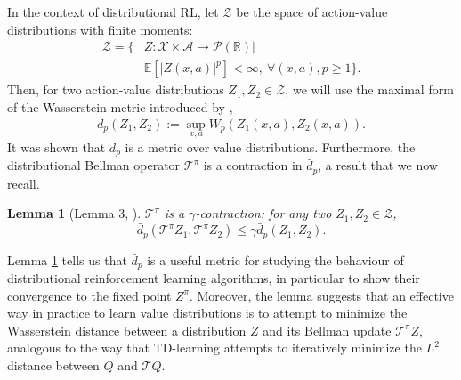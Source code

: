\documentclass[letterpaper]{article}
\newcommand{\cZ}{\mathcal{Z}}
\newcommand{\cT}{\mathcal{T}}
\newtheorem{lem}{Lemma}
\def \cTpi {\cT^\pi}
\def \dip {\bar d_p}
\begin{document}
In the context of distributional RL, let $\cZ$ be the space of action-value distributions with finite  moments:
\begin{align*}
    \mathcal{Z} = \{ &Z : \mathcal{X} \times \mathcal{A} \rightarrow \mathscr{P}(\mathbb{R}) |\\     &\mathbb{E}\left\lbrack |Z(x, a)|^p \right\rbrack < \infty, \ \forall (x, a), p \geq 1 \}.
\end{align*}
Then, for two action-value distributions $Z_1, Z_2 \in \cZ$, we will use the maximal form of the Wasserstein metric introduced by \cite{c51},
\begin{equation}\label{eqn:maxw}
    \dip(Z_1, Z_2) := \sup_{x,a} W_p(Z_1(x, a), Z_2(x, a)).
\end{equation}
It was shown that $\dip$ is a metric over value distributions. Furthermore, the distributional Bellman operator $\cTpi$ is a contraction in $\dip$, a result that we now recall.
\begin{lem}[Lemma 3, \citeauthor{c51} \citeyear{c51}]\label{lem:wasserstein_contraction_operator}
$\cTpi$ is a $\gamma$-contraction: for any two $Z_1, Z_2 \in \cZ$,
\begin{equation*}
    \dip(\cTpi Z_1, \cTpi Z_2) \le \gamma \dip(Z_1, Z_2) .
\end{equation*}
\end{lem}
Lemma \ref{lem:wasserstein_contraction_operator} tells us that $\dip$ is a useful metric for studying the behaviour of distributional reinforcement learning algorithms, in particular to show their convergence to the fixed point $Z^\pi$. Moreover, the lemma suggests that an effective way in practice to learn value distributions is to attempt to minimize the Wasserstein distance between a distribution $Z$ and its Bellman update $\mathcal{T}^\pi Z$, analogous to the way that TD-learning attempts to iteratively minimize the $L^2$ distance between $Q$ and $\mathcal{T} Q$. 
\end{document}
